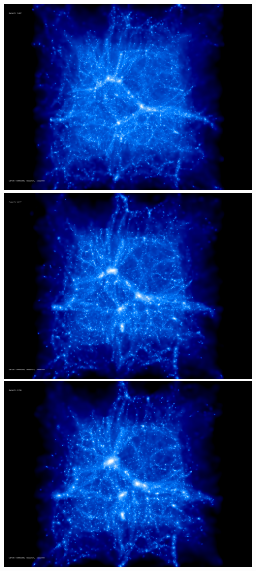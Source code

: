 \includegraphics[scale=0.1]{r256/h70/red_st14_log1/50.jpg} 
\includegraphics[scale=0.1]{r256/h70/red_st14_log1/100.jpg} \\ 
\includegraphics[scale=0.1]{r256/h70/red_st14_log1/150.jpg} 
